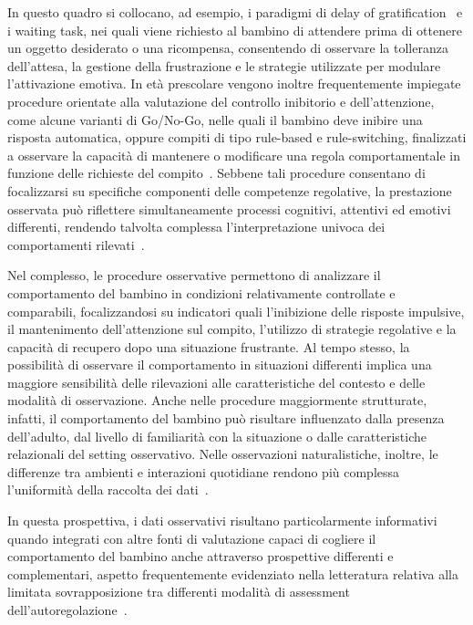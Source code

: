             In questo quadro si collocano, ad esempio, i paradigmi di delay of gratification~\cite{mischel1989} e i waiting task, nei quali viene richiesto al bambino di attendere prima di ottenere un oggetto desiderato o una ricompensa, consentendo di osservare la tolleranza dell'attesa, la gestione della frustrazione e le strategie utilizzate per modulare l'attivazione emotiva. In età prescolare vengono inoltre frequentemente impiegate procedure orientate alla valutazione del controllo inibitorio e dell'attenzione, come alcune varianti di Go/No-Go, nelle quali il bambino deve inibire una risposta automatica, oppure compiti di tipo rule-based e rule-switching, finalizzati a osservare la capacità di mantenere o modificare una regola comportamentale in funzione delle richieste del compito~\cite{carlson2005,garon2008}. Sebbene tali procedure consentano di focalizzarsi su specifiche componenti delle competenze regolative, la prestazione osservata può riflettere simultaneamente processi cognitivi, attentivi ed emotivi differenti, rendendo talvolta complessa l'interpretazione univoca dei comportamenti rilevati~\cite{hughes2002}.

            Nel complesso, le procedure osservative permettono di analizzare il comportamento del bambino in condizioni relativamente controllate e comparabili, focalizzandosi su indicatori quali l'inibizione delle risposte impulsive, il mantenimento dell'attenzione sul compito, l'utilizzo di strategie regolative e la capacità di recupero dopo una situazione frustrante. Al tempo stesso, la possibilità di osservare il comportamento in situazioni differenti implica una maggiore sensibilità delle rilevazioni alle caratteristiche del contesto e delle modalità di osservazione. Anche nelle procedure maggiormente strutturate, infatti, il comportamento del bambino può risultare influenzato dalla presenza dell'adulto, dal livello di familiarità con la situazione o dalle caratteristiche relazionali del setting osservativo. Nelle osservazioni naturalistiche, inoltre, le differenze tra ambienti e interazioni quotidiane rendono più complessa l'uniformità della raccolta dei dati~\cite{toplak2013}.

            In questa prospettiva, i dati osservativi risultano particolarmente informativi quando integrati con altre fonti di valutazione capaci di cogliere il comportamento del bambino anche attraverso prospettive differenti e complementari, aspetto frequentemente evidenziato nella letteratura relativa alla limitata sovrapposizione tra differenti modalità di assessment dell'autoregolazione~\cite{toplak2013}.


